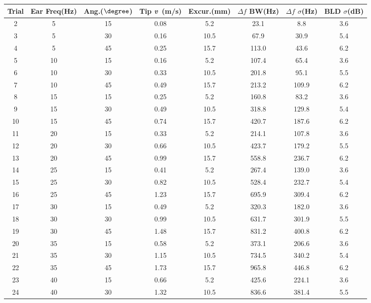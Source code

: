 \begin{table}[t]
\centering
\scriptsize
\begin{tabularx}{\linewidth}{c c c c c c c c}
\toprule
\textbf{Trial} & \textbf{Ear Freq(Hz)} & \textbf{Ang.($\degree$)} & \textbf{Tip \textit{v}~(m/s)} & \textbf{Excur.(mm)} & \textbf{$\Delta f$ BW(Hz)} & \textbf{$\Delta f$ $\sigma$(Hz)} & \textbf{BLD $\sigma$(dB)} \\
\midrule
2 & 5 & 15 & 0.08 & 5.2 & 23.1 & 8.8 & 3.6 \\
3 & 5 & 30 & 0.16 & 10.5 & 67.9 & 30.9 & 5.4 \\
4 & 5 & 45 & 0.25 & 15.7 & 113.0 & 43.6 & 6.2 \\
5 & 10 & 15 & 0.16 & 5.2 & 107.4 & 65.4 & 3.6 \\
6 & 10 & 30 & 0.33 & 10.5 & 201.8 & 95.1 & 5.5 \\
7 & 10 & 45 & 0.49 & 15.7 & 213.2 & 109.9 & 6.2 \\
8 & 15 & 15 & 0.25 & 5.2 & 160.8 & 83.2 & 3.6 \\
9 & 15 & 30 & 0.49 & 10.5 & 318.8 & 129.8 & 5.4 \\
10 & 15 & 45 & 0.74 & 15.7 & 420.7 & 187.6 & 6.2 \\
11 & 20 & 15 & 0.33 & 5.2 & 214.1 & 107.8 & 3.6 \\
12 & 20 & 30 & 0.66 & 10.5 & 423.7 & 179.2 & 5.5 \\
13 & 20 & 45 & 0.99 & 15.7 & 558.8 & 236.7 & 6.2 \\
14 & 25 & 15 & 0.41 & 5.2 & 267.4 & 139.0 & 3.6 \\
15 & 25 & 30 & 0.82 & 10.5 & 528.4 & 232.7 & 5.4 \\
16 & 25 & 45 & 1.23 & 15.7 & 695.9 & 309.4 & 6.2 \\
17 & 30 & 15 & 0.49 & 5.2 & 320.3 & 182.0 & 3.6 \\
18 & 30 & 30 & 0.99 & 10.5 & 631.7 & 301.9 & 5.5 \\
19 & 30 & 45 & 1.48 & 15.7 & 831.2 & 400.8 & 6.2 \\
20 & 35 & 15 & 0.58 & 5.2 & 373.1 & 206.6 & 3.6 \\
21 & 35 & 30 & 1.15 & 10.5 & 734.5 & 340.2 & 5.4 \\
22 & 35 & 45 & 1.73 & 15.7 & 965.8 & 446.8 & 6.2 \\
23 & 40 & 15 & 0.66 & 5.2 & 425.6 & 224.1 & 3.6 \\
24 & 40 & 30 & 1.32 & 10.5 & 836.6 & 381.4 & 5.5 \\

\end{tabularx}
\end{table}
